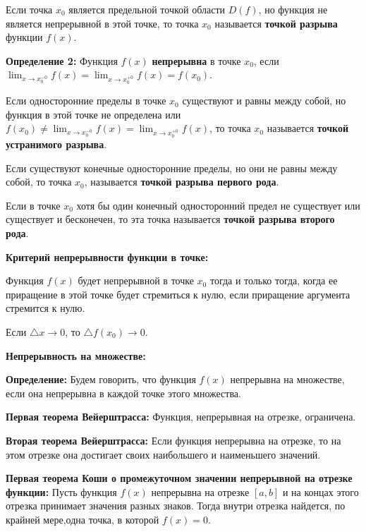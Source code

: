 \documentclass[12pt]{matmex-diploma}
\begin{document}
            Если точка $x_0$ является предельной точкой области $D(f)$, но функция не является непрерывной в этой точке, то точка $x_0$ называется \textbf{точкой разрыва} функции $f(x)$.
            
            \textbf{Определение 2:}
            Функция $f(x)$ \textbf{непрерывна} в точке $x_0$, если $\lim_{x \to x_0^{-0}}f(x) = \lim_{x \to x_0^{+0}}f(x)  = f(x_0)$.
            
            Если односторонние пределы в точке $x_0$ существуют и равны между собой, но функция в этой точке не определена или $f(x_0) \neq  \lim_{x \to x_0^{-0}}f(x) = \lim_{x \to x_0^{+0}}f(x)$, то точка $x_0$ называется \textbf{точкой устранимого разрыва}.
            
            Если существуют конечные односторонние пределы, но они не равны между собой, то точка $x_0$, называется \textbf{точкой разрыва первого рода}.
            
            Если в точке $x_0$ хотя бы один конечный односторонний предел не существует или существует и бесконечен, то эта точка называется \textbf{точкой разрыва второго рода}.
            
            \textbf{Критерий непрерывности функции в точке:}
            
            Функция $f(x)$ будет непрерывной в точке $x_0$ тогда и только тогда, когда ее приращение в этой точке будет стремиться к нулю, если приращение аргумента стремится к нулю.
            
            Если $\bigtriangleup x \to 0$, то $\bigtriangleup f(x_0) \to 0$.
            
            \textbf{Непрерывность на множестве:}
            
            \textbf{Определение:}
            Будем говорить, что функция $f(x)$ непрерывна на множестве, если она непрерывна в каждой точке этого множества.
            
            \textbf{Первая теорема Вейерштрасса: }
            Функция, непрерывная на отрезке, ограничена.
            
            \textbf{Вторая теорема Вейерштрасса: }
            Если функция непрерывна на отрезке, то на этом отрезке она достигает своих наибольшего и наименьшего значений.
            
            \textbf{Первая теорема Коши о промежуточном значении непрерывной на отрезке функции: }
            Пусть функция $f(x)$ непрерывна на отрезке $\left[ {a , b} \right]$ и на концах этого отрезка принимает значения разных знаков. Тогда внутри отрезка найдется, по крайней мере,одна точка, в которой $f(x) = 0$. 
            
\end{document}
